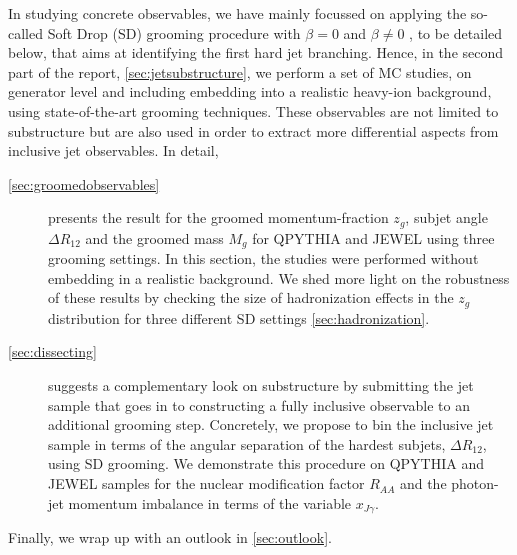 In studying concrete observables, we have mainly focussed on applying the so-called Soft Drop (SD) grooming procedure with $\beta = 0$ \cite{Dasgupta:2013ihk} and $\beta \neq 0$ \cite{Larkoski:2014wba}, to be detailed below, that aims at identifying the first hard jet branching. 
Hence, in the second part of the report, \autoref{sec:jetsubstructure}, we perform a set of MC studies, on generator level and including embedding into a realistic heavy-ion background, using state-of-the-art grooming techniques. These observables are  not limited to substructure but are also used in order to extract more differential aspects from inclusive jet observables. In detail, 
\begin{description}
\item[\autoref{sec:groomedobservables}] presents the result for the groomed momentum-fraction $z_g$, subjet angle $\Delta R_{12}$ and the groomed mass  $M_g$ for QPYTHIA and JEWEL using three grooming settings. In this section, the studies were performed without embedding in a realistic background. We shed more light on the robustness of these results by checking the size of hadronization effects in the $z_g$ distribution for three different SD settings \autoref{sec:hadronization}. 
\item[\autoref{sec:dissecting}] suggests a complementary look on substructure by submitting the jet sample that goes in to constructing a fully inclusive observable to an additional grooming step. Concretely, we propose to bin the inclusive jet sample in terms of the angular separation of the hardest subjets, $\Delta R_{12}$, using SD grooming. We demonstrate this procedure on QPYTHIA and JEWEL samples for the nuclear modification factor $R_{AA}$ and the photon-jet momentum imbalance in terms of the variable $x_{J\gamma}$.
\end{description}
Finally, we wrap up with an outlook in \autoref{sec:outlook}.



